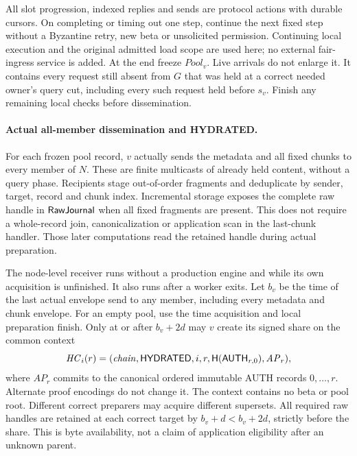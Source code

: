 All slot progression, indexed replies and sends are protocol actions
with durable cursors. On completing or timing out one step, continue
the next fixed step without a Byzantine retry, new beta or unsolicited
permission. Continuing local execution and the original admitted load
scope are used here; no external fair-ingress service is added. At the
end freeze $\mathit{Pool}_v$. Live arrivals do not enlarge it. It
contains every request still absent from $G$ that was held at a correct
needed owner's query cut, including every such request held before
$s_v$. Finish any remaining local checks before dissemination.

\paragraph{Actual all-member dissemination and HYDRATED.}
For each frozen pool record, $v$ actually sends the metadata and all
fixed chunks to every member of $N$. These are finite multicasts of
already held content, without a query phase. Recipients stage out-of-order
fragments and deduplicate by sender, target, record and chunk index.
Incremental storage exposes the complete raw handle in
$\mathsf{RawJournal}$ when all fixed fragments are present. This does
not require a whole-record join, canonicalization or application scan
in the last-chunk handler. Those later computations read the retained
handle during actual preparation.

The node-level receiver runs without a production engine and while
its own acquisition is unfinished. It also runs after a worker exits.
Let $b_v$ be the time of the last actual envelope send to any member,
including every metadata and chunk envelope. For an empty pool, use
the time acquisition and local preparation finish. Only at or after
$b_v+2d$ may $v$ create its signed share on the common context
\[
 \mathit{HC}_i(r)=
 (\mathit{chain},\mathsf{HYDRATED},i,r,
   \mathsf H(\mathsf{AUTH}_{r,0}),\mathit{AP}_r),
\]
where $\mathit{AP}_r$ commits to the canonical ordered immutable AUTH
records $0,\ldots,r$. Alternate proof encodings do not change it.
The context contains no beta or pool root. Different correct
preparers may acquire different supersets. All required raw handles
are retained at each correct target by $b_v+d<b_v+2d$, strictly before
the share. This is byte availability, not a claim of application
eligibility after an unknown parent.

